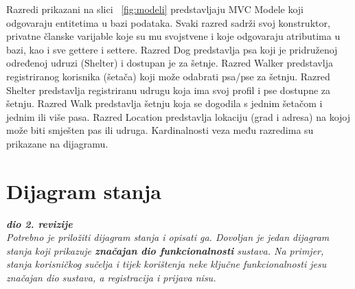			
		Razredi prikazani na slici ~\ref{fig:modeli} predstavljaju MVC Modele koji odgovaraju entitetima u bazi podataka. Svaki razred sadrži svoj konstruktor, privatne članske varijable koje su mu svojstvene i koje odgovaraju atributima u bazi, kao i sve gettere i settere.
		Razred Dog predstavlja psa koji je pridruženoj određenoj udruzi (Shelter) i dostupan je za šetnje. Razred Walker predstavlja registriranog korisnika (šetača) koji može odabrati psa/pse za šetnju. Razred Shelter predstavlja registriranu udrugu koja ima svoj profil i pse dostupne za šetnju. Razred Walk predstavlja šetnju koja se dogodila s jednim šetačom i jednim ili više pasa. Razred Location predstavlja lokaciju (grad i adresa) na kojoj može biti smješten pas ili udruga. Kardinalnosti veza među razredima su prikazane na dijagramu.
			
			

			
			\eject
		
		\section{Dijagram stanja}
			
			
			\textbf{\textit{dio 2. revizije}}\\
			
			\textit{Potrebno je priložiti dijagram stanja i opisati ga. Dovoljan je jedan dijagram stanja koji prikazuje \textbf{značajan dio funkcionalnosti} sustava. Na primjer, stanja korisničkog sučelja i tijek korištenja neke ključne funkcionalnosti jesu značajan dio sustava, a registracija i prijava nisu. }
			
			
			\eject 
		
